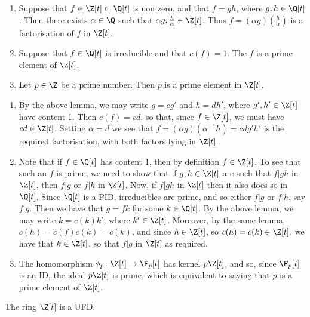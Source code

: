 \documentclass{maths}
\begin{document}
\begin{lem}
    \begin{enumerate}
        \item Suppose that  $f\in\Z[t]\subset\Q[t]$ is non zero, and that $f=gh$, where $g,h\in\Q[t]$.
        Then there exists $\alpha\in\Q$ such that $\alpha g,\frac{h}{\alpha}\in\Z[t]$.
        Thus $f=(\alpha g)(\frac{h}{\alpha})$ is a factorisation of $f$ in $\Z[t]$.
        \item Suppose that $f\in\Q[t]$ is irreducible and that $c(f)=1$.
        The $f$ is a prime element of $\Z[t]$.
        \item Let $p\in\Z$ be a prime number.
        Then $p$ is a prime element in $\Z[t]$.
    \end{enumerate}
\end{lem}

\begin{prf}
    \begin{enumerate}
        \item By the above lemma, we may write $g=cg'$ and $h=dh'$, where $g',h'\in\Z[t]$ have content 1.
        Then $c(f)=cd$, so that, since $f\in\Z[t]$, we must have $cd\in\Z[t]$.
        Setting $\alpha=d$ we see that $f=(\alpha g)(\alpha^{-1}h)=cdg'h'$ is the required factorisation, with both factors lying in $\Z[t]$.
        \item Note that if $f\in\Q[t]$ has content 1, then by definition $f\in\Z[t]$.
        To see that such an $f$ is prime, we need to show that if $g,h\in\Z[t]$ are such that $f|gh$ in $\Z[t]$, then $f|g$ or $f|h$ in $\Z[t]$.
        Now, if $f|gh$ in $\Z[t]$ then it also does so in $\Q[t]$.
        Since $\Q[t]$ is a PID, irreducibles are prime, and so either $f|g$ or $f|h$, say $f|g$.
        Then we have that $g=fk$ for some $k\in\Q[t]$.
        By the above lemma, we may write $k=c(k)k'$, where $k'\in\Z[t]$.
        Moreover, by the same lemma, $c(h)=c(f)c(k)=c(k)$, and since $h\in\Z[t]$, so $c(h)=c(k)\in\Z[t]$, we have that $k\in\Z[t]$, so that $f|g$ in $\Z[t]$ as required.
        \item The homomorphism $\phi_p\colon\Z[t]\to\F_p[t]$ has kernel $p\Z[t]$, and so, since $\F_p[t]$ is an ID, the ideal $p\Z[t]$ is prime, which is equivalent to saying that $p$ is a prime element of $\Z[t]$.
    \end{enumerate}
\end{prf}

\begin{thm}
    The ring $\Z[t]$ is a UFD.
\end{thm}
\end{document}
